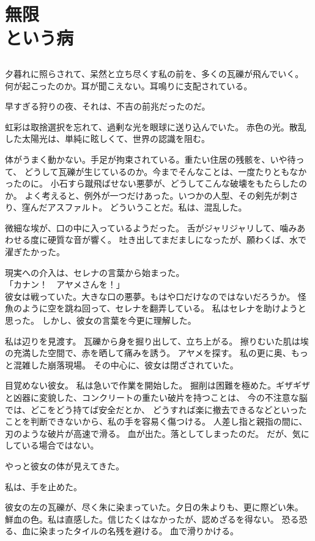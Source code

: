 \documentclass[../IHMain]{subfiles}
\begin{document}
\chapter{無限\\という病}
\section{}
夕暮れに照らされて、呆然と立ち尽くす私の前を、多くの瓦礫が飛んでいく。
何が起こったのか。耳が聞こえない。耳鳴りに支配されている。

早すぎる狩りの夜、それは、不吉の前兆だったのだ。

虹彩は取捨選択を忘れて、過剰な光を眼球に送り込んでいた。
赤色の光。散乱した太陽光は、単純に眩しくて、世界の認識を阻む。

体がうまく動かない。手足が拘束されている。重たい住居の残骸を、いや待って、
どうして瓦礫が生じているのか。今までそんなことは、一度たりともなかったのに。
小石すら蹴飛ばせない悪夢が、どうしてこんな破壊をもたらしたのか。
よく考えると、例外が一つだけあった。いつかの人型、その剣先が刺さり、窪んだアスファルト。
どういうことだ。私は、混乱した。

微細な埃が、口の中に入っているようだった。
舌がジャリジャリして、噛みあわせる度に硬質な音が響く。
吐き出してまだましになったが、願わくば、水で濯ぎたかった。

現実への介入は、セレナの言葉から始まった。\\
「カナン！　アヤメさんを！」\\
彼女は戦っていた。大きな口の悪夢。もはや口だけなのではないだろうか。
怪魚のように空を跳ね回って、セレナを翻弄している。
私はセレナを助けようと思った。
しかし、彼女の言葉を今更に理解した。

私は辺りを見渡す。
瓦礫から身を掘り出して、立ち上がる。
擦りむいた肌は埃の充満した空間で、赤を晒して痛みを誘う。
アヤメを探す。
私の更に奥、もっと混雑した崩落現場。
その中心に、彼女は閉ざされていた。

目覚めない彼女。
私は急いで作業を開始した。
掘削は困難を極めた。ギザギザと凶器に変貌した、コンクリートの重たい破片を持つことは、
今の不注意な脳では、どこをどう持てば安全だとか、
どうすれば楽に撤去できるなどといったことを判断できないから、私の手を容易く傷つける。
人差し指と親指の間に、刃のような破片が高速で滑る。
血が出た。落としてしまったのだ。
だが、気にしている場合ではない。

やっと彼女の体が見えてきた。

私は、手を止めた。

彼女の左の瓦礫が、尽く朱に染まっていた。夕日の朱よりも、更に際どい朱。
鮮血の色。私は直感した。信じたくはなかったが、認めざるを得ない。
恐る恐る、血に染まったタイルの名残を避ける。
血で滑りかける。
\end{document}
